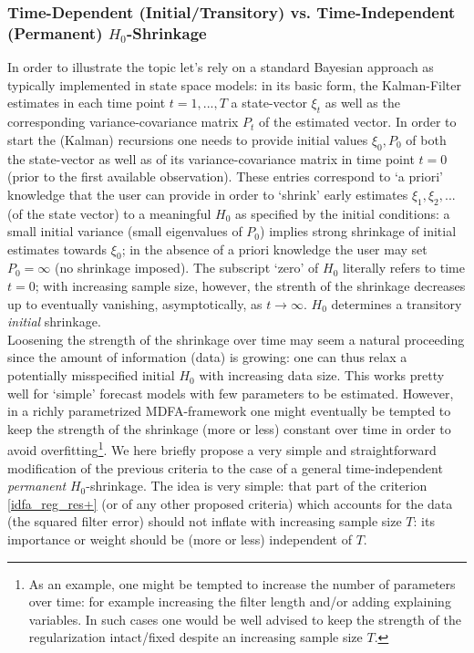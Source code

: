 \documentclass[11pt]{article}
\begin{document}
\subsubsection{Time-Dependent (Initial/Transitory) vs. Time-Independent (Permanent) $H_0$-Shrinkage}

In order to illustrate the topic let's rely on a standard Bayesian approach as typically implemented in state space models: in its basic form, the Kalman-Filter estimates in each time point $t=1,...,T$ a state-vector $\xi_t$ as well as the corresponding variance-covariance matrix $P_t$ of the estimated vector. In order to start the (Kalman) recursions one needs to provide initial values $\xi_0,P_0$ of both the state-vector as well as of its variance-covariance matrix in time point $t=0$ (prior to the first available observation). These entries correspond to `a priori' knowledge that the user can provide in order to `shrink' early estimates $\xi_1,\xi_2,...$ (of the state vector) to a meaningful $H_0$ as specified by the initial conditions: a small initial variance (small eigenvalues of $P_0$) implies strong shrinkage of initial estimates towards $\xi_0$;  in the absence of a priori knowledge the user may set $P_0=\infty$ (no shrinkage imposed). The subscript `zero' of $H_0$ literally refers to time $t=0$; with increasing sample size, however, the strenth of the shrinkage decreases up to eventually vanishing, asymptotically, as $t\to\infty$. $H_0$ determines a transitory \emph{initial} shrinkage.\\

Loosening the strength of the shrinkage over time may seem a natural proceeding since the amount of information (data) is growing: one can thus relax a potentially misspecified initial $H_0$ with increasing data size. This works pretty well for `simple' forecast models with few  parameters to be estimated. However, in a richly parametrized MDFA-framework one might eventually be tempted to keep the strength of the shrinkage (more or less) constant over time in order to avoid overfitting\footnote{As an example, one might be tempted to increase the number of parameters over time: for example increasing the filter length and/or adding explaining variables. In  such cases one would be well advised to keep the strength of the regularization intact/fixed despite an increasing sample size $T$.}. We here briefly propose a very simple and straightforward modification of the previous criteria to the case of a general {time-independent} \emph{permanent} $H_0$-shrinkage. The idea is very simple: that part of the criterion  \ref{idfa_reg_res+} (or of any other proposed criteria) which accounts for the data (the squared filter error) should not inflate with increasing sample size $T$: its importance or weight should be (more or less) independent of $T$.\\
\end{document}

